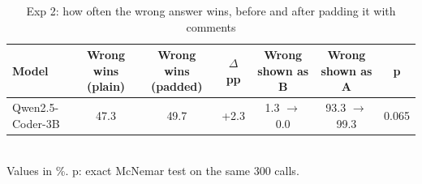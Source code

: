 \begin{table}[t]
\centering
\caption{Exp 2: how often the wrong answer wins, before and after padding it with comments}
\label{tab:t4_verbosity}
\footnotesize
\setlength{\tabcolsep}{3pt}
\begin{tabular}{lcccccc}
\hline
Model & Wrong wins (plain) & Wrong wins (padded) & $\Delta$ pp & Wrong shown as B & Wrong shown as A & p \\
\hline
Qwen2.5-Coder-3B & 47.3 & 49.7 & +2.3 & 1.3 $\rightarrow$ 0.0 & 93.3 $\rightarrow$ 99.3 & 0.065 \\
\hline
\end{tabular}
\\[2pt]
{\scriptsize Values in \%. p: exact McNemar test on the same 300 calls.}
\end{table}
